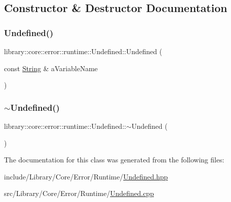 \subsection{Constructor \& Destructor Documentation}
\mbox{\label{classlibrary_1_1core_1_1error_1_1runtime_1_1_undefined_a585cecbe505147926980971fed942b95}} 
\subsubsection{\texorpdfstring{Undefined()}{Undefined()}}
{\footnotesize\ttfamily library\+::core\+::error\+::runtime\+::\+Undefined\+::\+Undefined (\begin{DoxyParamCaption}\item[{const \mbox{\hyperlink{classlibrary_1_1core_1_1types_1_1_string}{String}} \&}]{a\+Variable\+Name }\end{DoxyParamCaption})}

\mbox{\label{classlibrary_1_1core_1_1error_1_1runtime_1_1_undefined_a9069574e62bbe7aabab0519b6052cb69}} 
\subsubsection{\texorpdfstring{$\sim$Undefined()}{~Undefined()}}
{\footnotesize\ttfamily library\+::core\+::error\+::runtime\+::\+Undefined\+::$\sim$\+Undefined (\begin{DoxyParamCaption}{ }\end{DoxyParamCaption})}



The documentation for this class was generated from the following files\+:\begin{DoxyCompactItemize}
\item 
include/\+Library/\+Core/\+Error/\+Runtime/\mbox{\hyperlink{_undefined_8hpp}{Undefined.\+hpp}}\item 
src/\+Library/\+Core/\+Error/\+Runtime/\mbox{\hyperlink{_undefined_8cpp}{Undefined.\+cpp}}\end{DoxyCompactItemize}
